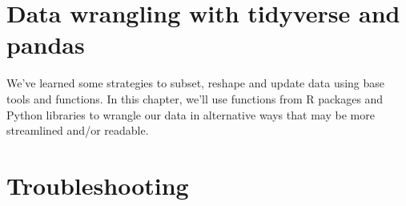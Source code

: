 \documentclass[
]{book}
\begin{document}
\hypertarget{wrangling}{%
\chapter{Data wrangling with tidyverse and pandas}\label{wrangling}}

We've learned some strategies to subset, reshape and update data using base tools and functions. In this chapter, we'll use functions from R packages and Python libraries to wrangle our data in alternative ways that may be more streamlined and/or readable.

\hypertarget{troubleshooting}{%
\chapter{Troubleshooting}\label{troubleshooting}}

  
\end{document}

